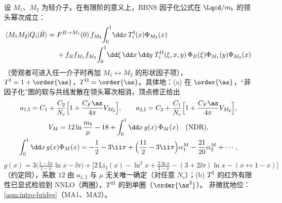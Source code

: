 \begin{proposition}\label{prop:heavy-qcdf-lp}
设 $M_1$、$M_2$ 为轻介子。在有限阶的意义上，BBNS 因子化公式在 $\Lqcd/m_b$ 的领头幂次成立：
\begin{equation}\label{eq:heavy-qcdf}
\begin{split}
\langle M_1M_2|Q_i|\bar B\rangle={}&F^{B\to M_1}(0)\,f_{M_2}\!\int_0^1\!\dd x\,T^{\rm I}_i(x)\Phi_{M_2}(x)\\
&+f_Bf_{M_1}f_{M_2}\!\int_0^1\!\dd\xi\,\dd x\,\dd y\;T^{\rm II}_i(\xi,x,y)\,\Phi_B(\xi)\Phi_{M_1}(y)\Phi_{M_2}(x)
\end{split}
\end{equation}
（旁观者可进入任一介子时再加 $M_1\leftrightarrow M_2$ 的形状因子项），$T^{\rm I}=1+\order{\as}$，$T^{\rm II}=\order{\as}$。具体地：(a) 在 $\order{\as}$，“非因子化”图的软与共线发散在领头幂次相消，顶点修正给出
\begin{gather}
a_{1,\rm I}=C_1+\frac{C_2}{N_c}\Big[1+\frac{C_F\as}{4\pi}V_{M_2}\Big],\qquad a_{2,\rm I}=C_2+\frac{C_1}{N_c}\Big[1+\frac{C_F\as}{4\pi}V_{M_2}\Big],\label{eq:heavy-ai}\\
V_M=12\ln\frac{m_b}{\mu}-18+\int_0^1\dd x\,g(x)\,\Phi_M(x)\quad(\text{NDR}),\label{eq:heavy-VM}\\
\int_0^1\dd x\,g(x)\Phi_M(x)=-\frac12-3\ii\pi+\Big(\frac{11}{2}-3\ii\pi\Big)\alpha_1^M-\frac{21}{20}\alpha_2^M+\cdots,\label{eq:heavy-gegen}
\end{gather}
$g(x)=3\big(\frac{1-2x}{1-x}\ln x-\ii\pi\big)+\big[2\,\mathrm{Li}_2(x)-\ln^2x+\frac{2\ln x}{1-x}-(3+2\ii\pi)\ln x-(x\leftrightarrow1-x)\big]$（约定同\cite{BenekeEtAl2001}），系数 $12$ 由 $a_{1,2}$ 与 $\mu$ 无关唯一确定（对任意 $N_c$）；(b) $T^{\rm I}$ 的红外有限性已显式检验到 NNLO（两圈），$T^{\rm II}$ 的到单圈（$\order{\as^2}$）。
非微扰地位：\cref{asm:intro-bridge}（MA1、MA2）。
\end{proposition}

